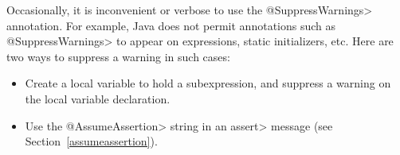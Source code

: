 
Occasionally, it is inconvenient or verbose to use the \<@SuppressWarnings>
annotation.
For example, Java does not permit annotations such as \<@SuppressWarnings> to
appear on expressions, static initializers, etc.
Here are two ways to suppress a warning in such cases:

\begin{itemize}
\item
  Create a local variable to hold a subexpression, and
  suppress a warning on the local variable declaration.
\item
  Use the \<@AssumeAssertion> string in
  an \<assert> message (see Section~\ref{assumeassertion}).
\end{itemize}


